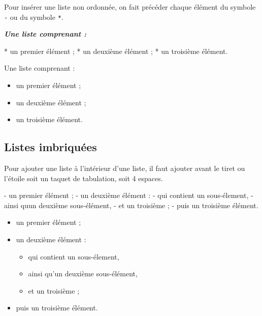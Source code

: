 \documentclass[
  11pt,
]{book}
\newenvironment{Shaded}{\begin{snugshade}}{\end{snugshade}}
\newcommand{\AnnotationTok}[1]{\textcolor[rgb]{0.56,0.35,0.01}{\textbf{\textit{#1}}}}
\newcommand{\NormalTok}[1]{#1}
\newcommand{\SpecialStringTok}[1]{\textcolor[rgb]{0.31,0.60,0.02}{#1}}
\providecommand{\tightlist}{%
  \setlength{\itemsep}{0pt}\setlength{\parskip}{0pt}}
\numberwithin{equation}{section}
\numberwithin{countremarque}{section}
\begin{document}
Pour insérer une liste non ordonnée, on fait précéder chaque élément du symbole \texttt{-} ou du symbole \texttt{*}.

\begin{Shaded}
\begin{Highlighting}[]
\AnnotationTok{Une liste comprenant :}

\SpecialStringTok{* }\NormalTok{un premier élément ;}
\SpecialStringTok{* }\NormalTok{un deuxième élément ;}
\SpecialStringTok{* }\NormalTok{un troisième élément.}
\end{Highlighting}
\end{Shaded}

Une liste comprenant :

\begin{itemize}
\tightlist
\item
  un premier élément ;
\item
  un deuxième élément ;
\item
  un troisième élément.
\end{itemize}

\hypertarget{listes-imbriquuxe9es}{%
\subsection{Listes imbriquées}\label{listes-imbriquuxe9es}}

Pour ajouter une liste à l'intérieur d'une liste, il faut ajouter avant le tiret ou l'étoile soit un taquet de tabulation, soit 4 espaces.

\begin{Shaded}
\begin{Highlighting}[]
\SpecialStringTok{{-} }\NormalTok{un premier élément ;}
\SpecialStringTok{{-} }\NormalTok{un deuxième élément :}
\SpecialStringTok{    {-} }\NormalTok{qui contient un sous{-}élement,}
\SpecialStringTok{    {-} }\NormalTok{ainsi qu\textquotesingle{}un deuxième sous{-}élément,}
\SpecialStringTok{    {-} }\NormalTok{et un troisième ;}
\SpecialStringTok{{-} }\NormalTok{puis un troisième élément.}
\end{Highlighting}
\end{Shaded}

\begin{itemize}
\tightlist
\item
  un premier élément ;
\item
  un deuxième élément :

  \begin{itemize}
  \tightlist
  \item
    qui contient un sous-élement,
  \item
    ainsi qu'un deuxième sous-élément,
  \item
    et un troisième ;
  \end{itemize}
\item
  puis un troisième élément.
\end{itemize}
\end{document}
